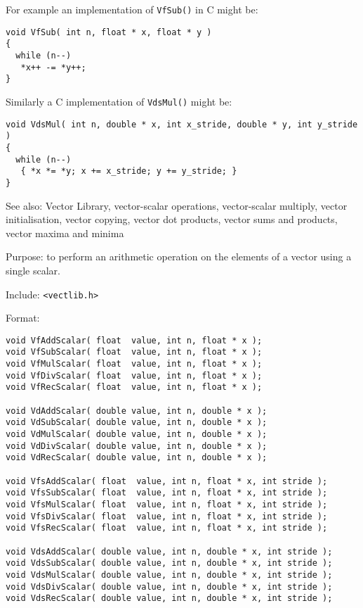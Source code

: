For example an implementation of {\tt VfSub()} in C might be:

\begin{verbatim}
void VfSub( int n, float * x, float * y )
{
  while (n--)
   *x++ -= *y++;
}
\end{verbatim}

Similarly a C implementation of {\tt VdsMul()} might be:

\begin{verbatim}
void VdsMul( int n, double * x, int x_stride, double * y, int y_stride )
{
  while (n--)
   { *x *= *y; x += x_stride; y += y_stride; }
}
\end{verbatim}

See also: Vector Library, vector-scalar operations, vector-scalar multiply,
vector initialisation, vector copying, vector dot products, vector sums and
products, vector maxima and minima


Purpose: to perform an arithmetic operation on the elements of a vector
using a single scalar.

Include: \verb+<vectlib.h>+

Format:

\begin{verbatim}
void VfAddScalar( float  value, int n, float * x );
void VfSubScalar( float  value, int n, float * x );
void VfMulScalar( float  value, int n, float * x );
void VfDivScalar( float  value, int n, float * x );
void VfRecScalar( float  value, int n, float * x );

void VdAddScalar( double value, int n, double * x );
void VdSubScalar( double value, int n, double * x );
void VdMulScalar( double value, int n, double * x );
void VdDivScalar( double value, int n, double * x );
void VdRecScalar( double value, int n, double * x );

void VfsAddScalar( float  value, int n, float * x, int stride );
void VfsSubScalar( float  value, int n, float * x, int stride );
void VfsMulScalar( float  value, int n, float * x, int stride );
void VfsDivScalar( float  value, int n, float * x, int stride );
void VfsRecScalar( float  value, int n, float * x, int stride );

void VdsAddScalar( double value, int n, double * x, int stride );
void VdsSubScalar( double value, int n, double * x, int stride );
void VdsMulScalar( double value, int n, double * x, int stride );
void VdsDivScalar( double value, int n, double * x, int stride );
void VdsRecScalar( double value, int n, double * x, int stride );
\end{verbatim}


